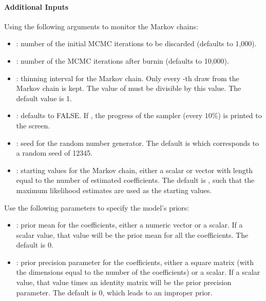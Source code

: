 \documentclass[letterpaper,10pt,english]{sphinxmanual}
\begin{document}
\paragraph{Additional Inputs}
\label{zelig-probitbayes:additional-inputs}
Using the following arguments to monitor the Markov chains:
\begin{itemize}
\item {} 
: number of the initial MCMC iterations to be discarded
(defaults to 1,000).

\item {} 
: number of the MCMC iterations after burnin (defaults to
10,000).

\item {} 
: thinning interval for the Markov chain. Only every
-th draw from the Markov chain is kept. The value of 
must be divisible by this value. The default value is 1.

\item {} 
: defaults to FALSE. If , the progress of the
sampler (every \(10\%\)) is printed to the screen.

\item {} 
: seed for the random number generator. The default is 
which corresponds to a random seed of 12345.

\item {} 
: starting values for the Markov chain, either a scalar
or vector with length equal to the number of estimated coefficients.
The default is , such that the maximum likelihood estimates are
used as the starting values.

\end{itemize}

Use the following parameters to specify the model’s priors:
\begin{itemize}
\item {} 
: prior mean for the coefficients, either a numeric vector or a
scalar. If a scalar value, that value will be the prior mean for all
the coefficients. The default is 0.

\item {} 
: prior precision parameter for the coefficients, either a
square matrix (with the dimensions equal to the number of the
coefficients) or a scalar. If a scalar value, that value times an
identity matrix will be the prior precision parameter. The default is
0, which leads to an improper prior.

\end{itemize}
\end{document}
